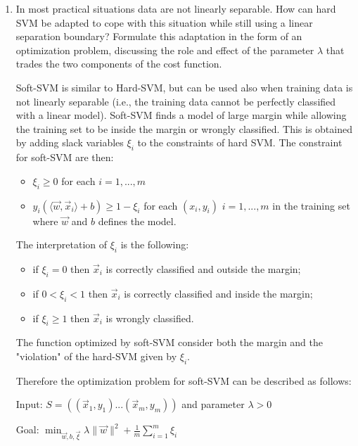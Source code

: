 \documentclass[a4paper,11pt,oneside]{book}
\begin{document}
\begin{enumerate}
\begin{solution}
    \end{solution}

\item In most practical situations data are not linearly separable. How can hard SVM be adapted to cope with this situation while still using a linear separation boundary? Formulate this adaptation in the form of an optimization problem, discussing the role and effect of the parameter $\lambda$ that trades the two components of the cost function.
    \begin{solution}
        Soft-SVM is similar to Hard-SVM, but can be used also when training data is not linearly separable (i.e., the training data cannot be perfectly classified with a linear model). Soft-SVM finds a model of large margin while allowing the training set to be inside the margin or wrongly classified. This is obtained by adding slack variables $\xi_i$ to the constraints of hard SVM. The constraint for soft-SVM are then:
        \begin{itemize}
        \item $\xi_i \geq 0$ for each $i = 1,...,m$
        \item $y_i(\langle \vec{w},\vec{x}_i \rangle +b) \geq 1 - \xi_i$ for each $(x_i,y_i)$ $i = 1,...,m$ in the training set where $\vec{w}$ and $b$ defines the model.
        \end{itemize}
        
        The interpretation of $\xi_i$ is the following:
        \begin{itemize}
        \item if $\xi_i = 0$ then $\vec{x}_i$ is correctly classified and outside the margin;
        \item if $0 < \xi_i < 1$ then $\vec{x}_i$ is correctly classified and inside the margin;
        \item if $\xi_i \geq 1$ then $\vec{x}_i$ is wrongly classified.
        \end{itemize}
        
        The function optimized by soft-SVM consider both the margin and the "violation" of the hard-SVM given by $\xi_i$.
        
        Therefore the optimization problem for soft-SVM can be described as follows:
        
        Input: $S = ((\vec{x}_1, y_1) ... (\vec{x}_m, y_m))$ and parameter $\lambda > 0$
        
        Goal: $\min_{\vec{w},b,\vec{\xi}} \lambda\|\vec{w}\|^2 + \frac{1}{m}\sum_{i=1}^m \xi_i$
        

\end{solution}
\end{enumerate}
\end{document}
